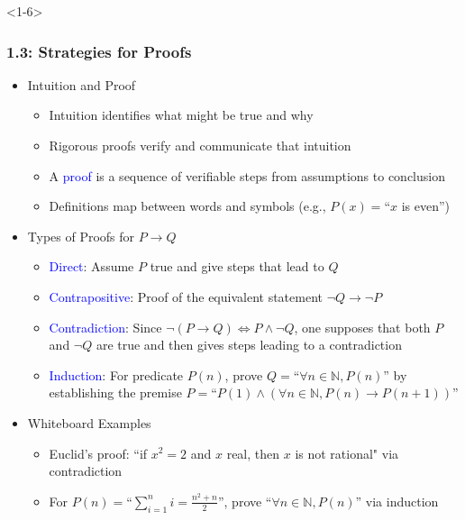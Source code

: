 \documentclass[10pt,english,aspectratio=169]{beamer}
\begin{document}
\begin{frame}<1-6> \frametitle{1.3: Strategies for Proofs}

\begin{itemize}
\setlength\itemsep{2.5mm}
\item<1-> Intuition and Proof \vspace{1mm}
\begin{itemize} 
 \setlength\itemsep{1.25mm}
 \item Intuition identifies what might be true and why
 \item Rigorous proofs verify and communicate that intuition
 \item A \textcolor{blue}{proof} is a sequence of verifiable steps from assumptions to conclusion
 \item Definitions map between words and symbols (e.g., $P(x)=$``$x$ is even'') 
\end{itemize}

\item<2-> Types of Proofs for $P \rightarrow Q$  \vspace{1mm}
\begin{itemize} 
 \setlength\itemsep{1.25mm}
 \item<2-> \textcolor{blue}{Direct}: Assume $P$ true and give steps that lead to $Q$
 \item<3-> \textcolor{blue}{Contrapositive}: Proof of the equivalent statement $\neg Q \rightarrow \neg P$
 \item<4-> \textcolor{blue}{Contradiction}: Since $\neg (P \rightarrow Q) \Leftrightarrow P \wedge \neg Q$, one supposes that both $P$ and $\neg Q$ are true and then gives steps leading to a contradiction
 \item<5-> \textcolor{blue}{Induction}: For predicate $P(n)$, prove $Q=$``$\forall n\in\mathbb{N}, P(n)$'' by establishing the premise $P=$``$P(1) \wedge (\forall n\in \mathbb{N}, P(n) \rightarrow P(n\!+\!1))$''
\end{itemize}

\item<6-> Whiteboard Examples \vspace{1mm}
\begin{itemize} 
 \setlength\itemsep{1.25mm}
 \item Euclid's proof: ``if $x^2 = 2$ and $x$ real, then $x$ is not rational" via contradiction$\!\!\!\!\!\!\!$
 \item For $P(n)=$``$\sum_{i=1}^n i = \frac{n^2 + n}{2}$'', prove ``$\forall n\in \mathbb{N}, P(n)$'' via induction
\end{itemize}
\end{itemize}


\end{frame}
\end{document}

